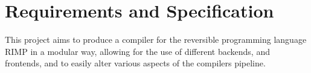\chapter*{Requirements and Specification}

This project aims to produce a compiler for the reversible programming language RIMP in a modular way, allowing for the use of different backends, and frontends, and to easily alter various aspects of the compilers pipeline.


